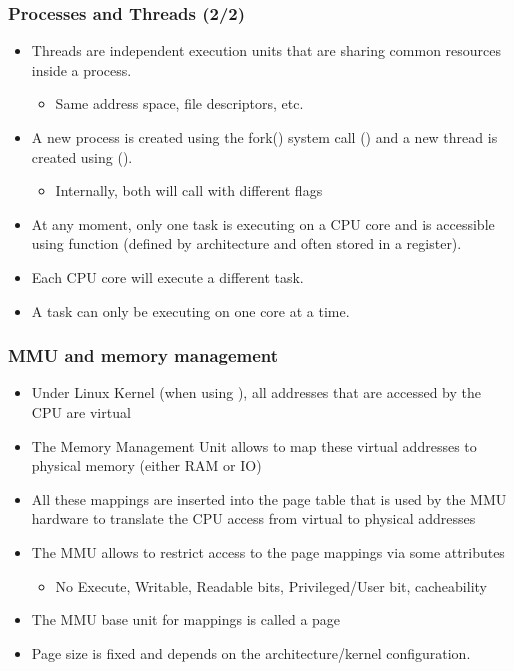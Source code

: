 \begin{frame}
  \frametitle{Processes and Threads (2/2)}
  \begin{itemize}
    \item Threads are independent execution units that are sharing common
          resources inside a process.
    \begin{itemize}
      \item Same address space, file descriptors, etc.
    \end{itemize}
    \item A new process is created using the fork() system call
          () and a new thread is created using
           ().
    \begin{itemize}
      \item Internally, both will call  with different flags
    \end{itemize}
    \item At any moment, only one task is executing on a CPU core and is
          accessible using  function (defined by
          architecture and often stored in a register).
    \item Each CPU core will execute a different task.
    \item A task can only be executing on one core at a time.
  \end{itemize}
\end{frame}

\begin{frame}
  \frametitle{MMU and memory management}
  \begin{itemize}
    \item Under Linux Kernel (when using ), all addresses
          that are accessed by the CPU are virtual
    \item The Memory Management Unit allows to map these virtual addresses to
          physical memory (either RAM or IO)
    \item All these mappings are inserted into the page table that is used
          by the MMU hardware to translate the CPU access from virtual to
          physical addresses
    \item The MMU allows to restrict access to the page mappings via some
          attributes
    \begin{itemize}
      \item No Execute, Writable, Readable bits, Privileged/User bit, cacheability
    \end{itemize}
    \item The MMU base unit for mappings is called a page
    \item Page size is fixed and depends on the architecture/kernel
          configuration.
  \end{itemize}
\end{frame}

